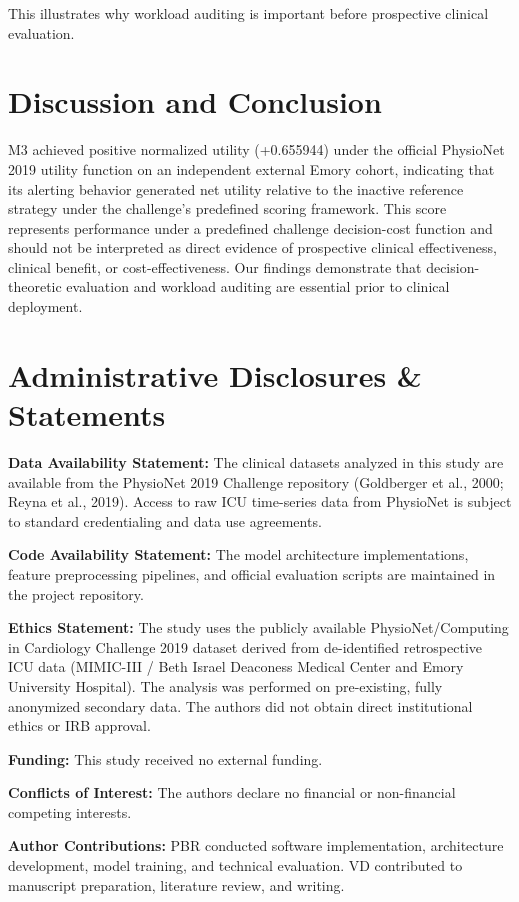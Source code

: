 \documentclass[11pt,a4paper]{article}
\begin{document}
This illustrates why workload auditing is important before prospective clinical evaluation.

\section{Discussion and Conclusion}
M3 achieved positive normalized utility (+0.655944) under the official PhysioNet 2019 utility function on an independent external Emory cohort, indicating that its alerting behavior generated net utility relative to the inactive reference strategy under the challenge's predefined scoring framework. This score represents performance under a predefined challenge decision-cost function and should not be interpreted as direct evidence of prospective clinical effectiveness, clinical benefit, or cost-effectiveness. Our findings demonstrate that decision-theoretic evaluation and workload auditing are essential prior to clinical deployment.

\section*{Administrative Disclosures \& Statements}

\textbf{Data Availability Statement:} The clinical datasets analyzed in this study are available from the PhysioNet 2019 Challenge repository (Goldberger et al., 2000; Reyna et al., 2019). Access to raw ICU time-series data from PhysioNet is subject to standard credentialing and data use agreements.

\textbf{Code Availability Statement:} The model architecture implementations, feature preprocessing pipelines, and official evaluation scripts are maintained in the project repository.

\textbf{Ethics Statement:} The study uses the publicly available PhysioNet/Computing in Cardiology Challenge 2019 dataset derived from de-identified retrospective ICU data (MIMIC-III / Beth Israel Deaconess Medical Center and Emory University Hospital). The analysis was performed on pre-existing, fully anonymized secondary data. The authors did not obtain direct institutional ethics or IRB approval.

\textbf{Funding:} This study received no external funding.

\textbf{Conflicts of Interest:} The authors declare no financial or non-financial competing interests.

\textbf{Author Contributions:} PBR conducted software implementation, architecture development, model training, and technical evaluation. VD contributed to manuscript preparation, literature review, and writing.
\end{document}
